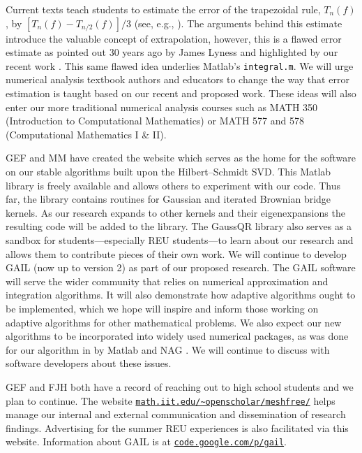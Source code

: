 \documentclass[11pt]{NSFamsart}
\newcommand{\Matlab}{{\sc Matlab}\xspace}
\begin{document}
\begin{description}[leftmargin=0ex]
Current texts teach students to estimate the error of the trapezoidal rule, $T_n(f)$, by $[T_n(f)-T_{n/2}(f)]/3$ (see, e.g., \cite[p.\ 223--224]{BurFai10}).  The arguments behind this estimate introduce the valuable concept of extrapolation, however, this is a flawed error estimate as pointed out $30$ years ago by James Lyness \cite{Lyn83} and highlighted by our recent work \cite{HicEtal14b}.  This same flawed idea underlies \Matlab's {\tt integral.m}.  We will urge numerical analysis textbook authors and educators to change the way that error estimation is taught based on our recent and proposed work.  These ideas will also enter our more traditional numerical analysis courses such as MATH 350 (Introduction to Computational Mathematics) or MATH 577 and 578 (Computational Mathematics I \& II).

\item[Creating Software and Collaborating with Software Developers]
GEF and MM have created the website \citep{McCFBG13} which serves as the home for the software on our stable algorithms built upon the Hilbert--Schmidt SVD. This \Matlab library is freely available and allows others to experiment with our code. Thus far, the library contains routines for Gaussian and iterated Brownian bridge kernels. As our research expands to other kernels and their eigenexpansions the resulting code will be added to the library. The GaussQR library also serves as a sandbox for students---especially REU students---to learn about our research and allows them to contribute pieces of their own work.
We will continue to develop GAIL \citep{ChoEtal14a} (now up to version 2) as part of our proposed research.  The GAIL software will serve the wider community that relies on numerical approximation and integration algorithms.  It will also demonstrate how adaptive algorithms ought to be implemented, which we hope will inspire and inform those working on adaptive algorithms for other mathematical problems.  We also expect our new algorithms to be incorporated into widely used numerical packages, as was done for our algorithm in \cite{HonHic00a} by \Matlab \citep{MAT8.4} and NAG \citep{NAG23}.  We will continue to discuss with software developers about these issues.

\item[Reaching Out]
GEF and FJH both have a record of reaching out to high school students and we plan to continue. The website \href{http://math.iit.edu/~openscholar/meshfree/}{\nolinkurl{math.iit.edu/~openscholar/meshfree/}} helps manage our internal and external communication and dissemination of research findings. Advertising for the summer REU experiences is also facilitated via this website.  Information about GAIL is at \href{http://code.google.com/p/gail}{\nolinkurl{code.google.com/p/gail}}.
\end{description}

\newpage
\clearpage
{}



\renewcommand{\refname}{\hfill \textbf{\large References Cited} \hfill \hfill}                   %
\renewcommand{\bibliofont}{\normalsize}


\end{document}
